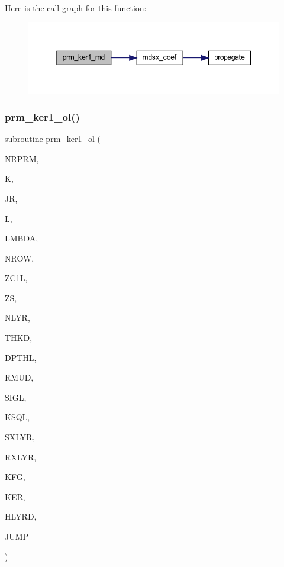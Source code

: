 Here is the call graph for this function\+:\nopagebreak
\begin{figure}[H]
\begin{center}
\leavevmode
\includegraphics[width=350pt]{Leroi__c_8f90_a3a9566c86f1c0b93bae5a6117621feae_cgraph}
\end{center}
\end{figure}
\mbox{\label{Leroi__c_8f90_a98390b637677e60abaa0fa6df3249f0b}} 
\subsubsection{\texorpdfstring{prm\+\_\+ker1\+\_\+ol()}{prm\_ker1\_ol()}}
{\footnotesize\ttfamily subroutine prm\+\_\+ker1\+\_\+ol (\begin{DoxyParamCaption}\item[{integer}]{N\+R\+P\+RM,  }\item[{integer}]{K,  }\item[{integer}]{JR,  }\item[{integer}]{L,  }\item[{real(kind=ql)}]{L\+M\+B\+DA,  }\item[{integer}]{N\+R\+OW,  }\item[{real, dimension(nrow)}]{Z\+C1L,  }\item[{real(kind=ql)}]{ZS,  }\item[{integer}]{N\+L\+YR,  }\item[{real(kind=ql), dimension (nlyr)}]{T\+H\+KD,  }\item[{real(kind=ql), dimension (nlyr)}]{D\+P\+T\+HL,  }\item[{real(kind=ql), dimension(0\+:nlyr)}]{R\+M\+UD,  }\item[{complex(kind=ql), dimension (nlyr)}]{S\+I\+GL,  }\item[{complex(kind=ql), dimension (nlyr)}]{K\+S\+QL,  }\item[{integer}]{S\+X\+L\+YR,  }\item[{integer}]{R\+X\+L\+YR,  }\item[{integer}]{K\+FG,  }\item[{complex (kind=ql), dimension(jnlo-\/nrprm\+:jnhi,3,nrow)}]{K\+ER,  }\item[{complex (kind=ql), dimension(nrprm,3,nrow)}]{H\+L\+Y\+RD,  }\item[{logical}]{J\+U\+MP }\end{DoxyParamCaption})}

